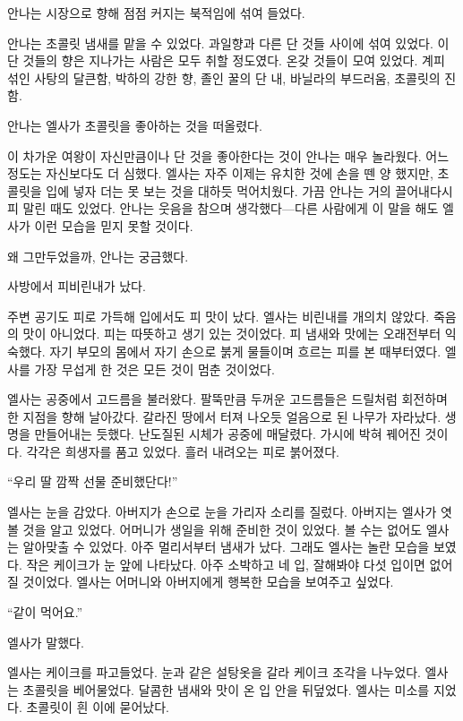\textbreak

안나는 시장으로 향해 점점 커지는 북적임에 섞여 들었다.

안나는 초콜릿 냄새를 맡을 수 있었다. 과일향과 다른 단 것들 사이에 섞여 있었다. 이 단 것들의 향은 지나가는 사람은 모두 취할 정도였다. 온갖 것들이 모여 있었다. 계피 섞인 사탕의 달큰함, 박하의 강한 향, 졸인 꿀의 단 내, 바닐라의 부드러움, 초콜릿의 진함.

안나는 엘사가 초콜릿을 좋아하는 것을 떠올렸다.

이 차가운 여왕이 자신만큼이나 단 것을 좋아한다는 것이 안나는 매우 놀라웠다. 어느 정도는 자신보다도 더 심했다. 엘사는 자주 이제는 유치한 것에 손을 뗀 양 했지만, 초콜릿을 입에 넣자 더는 못 보는 것을 대하듯 먹어치웠다. 가끔 안나는 거의 끌어내다시피 말린 때도 있었다. 안나는 웃음을 참으며 생각했다—다른 사람에게 이 말을 해도 엘사가 이런 모습을 믿지 못할 것이다.

왜 그만두었을까, 안나는 궁금했다.

\textbreak

사방에서 피비린내가 났다.

주변 공기도 피로 가득해 입에서도 피 맛이 났다. 엘사는 비린내를 개의치 않았다. 죽음의 맛이 아니었다. 피는 따뜻하고 생기 있는 것이었다. 피 냄새와 맛에는 오래전부터 익숙했다. 자기 부모의 몸에서 자기 손으로 붉게 물들이며 흐르는 피를 본 때부터였다. 엘사를 가장 무섭게 한 것은 모든 것이 멈춘 것이었다.

엘사는 공중에서 고드름을 불러왔다. 팔뚝만큼 두꺼운 고드름들은 드릴처럼 회전하며 한 지점을 향해 날아갔다. 갈라진 땅에서 터져 나오듯 얼음으로 된 나무가 자라났다. 생명을 만들어내는 듯했다. 난도질된 시체가 공중에 매달렸다. 가시에 박혀 꿰어진 것이다. 각각은 희생자를 품고 있었다. 흘러 내려오는 피로 붉어졌다.  %

``우리 딸 깜짝 선물 준비했단다!''

엘사는 눈을 감았다. 아버지가 손으로 눈을 가리자 소리를 질렀다. 아버지는 엘사가 엿볼 것을 알고 있었다. 어머니가 생일을 위해 준비한 것이 있었다. 볼 수는 없어도 엘사는 알아맞출 수 있었다. 아주 멀리서부터 냄새가 났다. 그래도 엘사는 놀란 모습을 보였다. 작은 케이크가 눈 앞에 나타났다. 아주 소박하고 네 입, 잘해봐야 다섯 입이면 없어질 것이었다. 엘사는 어머니와 아버지에게 행복한 모습을 보여주고 싶었다.

``같이 먹어요.''

엘사가 말했다.

엘사는 케이크를 파고들었다. 눈과 같은 설탕옷을 갈라 케이크 조각을 나누었다. 엘사는 초콜릿을 베어물었다. 달콤한 냄새와 맛이 온 입 안을 뒤덮었다. 엘사는 미소를 지었다. 초콜릿이 흰 이에 묻어났다.

